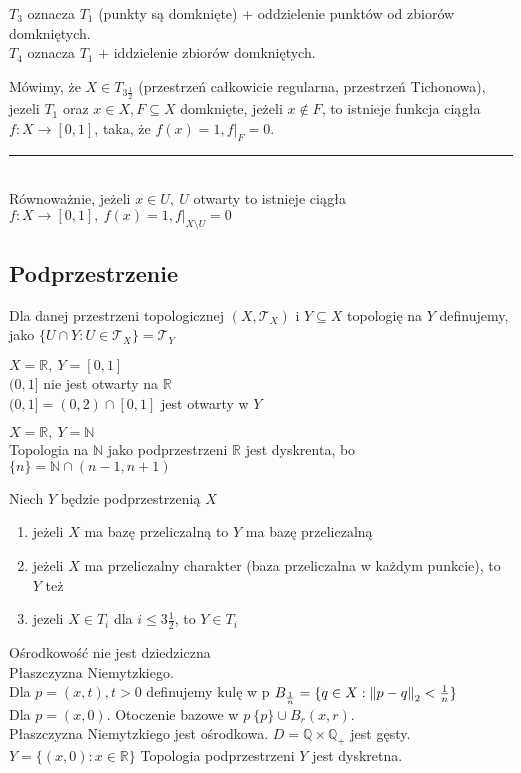 $T_3$ oznacza $T_1$ (punkty są domknięte) + oddzielenie punktów od zbiorów domkniętych. \\ 
$T_4$ oznacza $T_1$ + iddzielenie zbiorów domkniętych.
\begin{df} 
    Mówimy, że $X \in T_{3 \frac{1}{2}}$ (przestrzeń całkowicie regularna, przestrzeń Tichonowa), jezeli 
    $T_1$ oraz $x \in X, F \subseteq X$ domknięte, jeżeli $x \notin F$, 
    to istnieje funkcja ciągła $f : X \to [0,1]$, taka, że $f(x) = 1, f|_F = 0$. \\
    \rule{2cm}{0.4pt}\\ 
    Równoważnie, jeżeli $x \in U,\ U$ otwarty to istnieje ciągła $f: X \to [0,1],\ f(x) = 1, f|_{X\setminus U}= 0$
\end{df} 
\subsection{Podprzestrzenie} 
Dla danej przestrzeni topologicznej $(X,\mathcal T_X)$ i $Y \subseteq X$ topologię na $Y$ definujemy, jako 
$\{U \cap Y: U \in \mathcal T_X \} = \mathcal T_Y$
\begin{prz} 
    $X = \mathbb R,\ Y = [0,1]$ \\ 
    $(0,1]$ nie jest otwarty na $\mathbb R$ \\
    $(0,1] = (0,2) \cap [0,1]$ jest otwarty w $Y$
\end{prz} 
\begin{prz}
    $X = \mathbb R,\ Y = \mathbb N$ \\ 
    Topologia na $\mathbb N$ jako podprzestrzeni $\mathbb R$ jest dyskrenta, bo $ \{n\} = \mathbb N \cap (n-1,n+1)$
\end{prz}
\begin{tw} 
    Niech $Y$ będzie podprzestrzenią $X$
    \begin{enumerate}[(1)]
        \item jeżeli $X$ ma bazę przeliczalną to $Y$ ma bazę przeliczalną 
        \item jeżeli $X$ ma przeliczalny charakter (baza przeliczalna w każdym punkcie), to $Y$ też
        \item jezeli $X \in T_i$ dla $i \le 3 \frac{1}{2}$, to $Y \in T_i$
    \end{enumerate} 
\end{tw} 
\begin{prz} Ośrodkowość nie jest dziedziczna \\
    Płaszczyzna Niemytzkiego. \\ 
    Dla $p = (x,t), t > 0$ definujemy kulę w p $B_{\frac{1}{n}} = \{ q \in X : \left\lVert p-q\right\rVert_2 < \frac{1}{n} \}$ \\
    Dla $p = (x,0)$. Otoczenie bazowe w $p \ \{p\} \cup B_r (x,r)$. \\ 
    Płaszczyzna Niemytzkiego jest ośrodkowa. $D = \mathbb Q \times \mathbb Q_+$ jest gęsty. \\
    $Y = \{ (x,0) : x \in \mathbb R\}$ Topologia podprzestrzeni $Y$ jest dyskretna.
\end{prz} 
